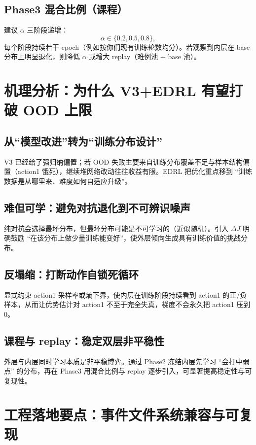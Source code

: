 \documentclass[UTF8,11pt,a4paper]{ctexart}
\begin{document}
\subsection{Phase3 混合比例（课程）}
建议 $\alpha$ 三阶段递增：
\begin{equation}
\alpha \in \{0.2,0.5,0.8\},
\end{equation}
每个阶段持续若干 epoch（例如按你们现有训练轮数均分）。若观察到内层在 base 分布上明显退化，则降低 $\alpha$ 或增大 replay（难例池 + base 池）。

\section{机理分析：为什么 V3+EDRL 有望打破 OOD 上限}

\subsection{从``模型改进''转为``训练分布设计''}
V3 已经给了强归纳偏置；若 OOD 失败主要来自训练分布覆盖不足与样本结构偏置（action1 饿死），继续堆网络改动往往收益有限。EDRL 把优化重点移到 ``训练数据是从哪里来、难度如何自适应升级''。

\subsection{难但可学：避免对抗退化到不可辨识噪声}
纯对抗会选择最坏分布，但最坏分布可能是不可学习的（近似随机）。引入 $\Delta J$ 明确鼓励 ``在该分布上做少量训练能变好''，使外层倾向生成具有训练价值的挑战分布。

\subsection{反塌缩：打断动作自锁死循环}
显式约束 action1 采样率或熵下界，使内层在训练阶段持续看到 action1 的正/负样本，从而让优势估计对 action1 不至于完全失真，梯度不会永久把 action1 压到 0。

\subsection{课程与 replay：稳定双层非平稳性}
外层与内层同时学习本质是非平稳博弈。通过 Phase2 冻结内层先学习 ``会打中弱点'' 的分布，再在 Phase3 用混合比例与 replay 逐步引入，可显著提高稳定性与可复现性。

\section{工程落地要点：事件文件系统兼容与可复现}
\end{document}
